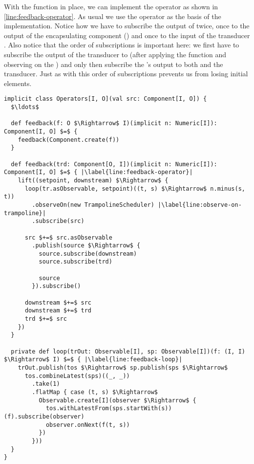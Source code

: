 With the  function in place, we can implement the  operator as shown in  \cref{line:feedback-operator}. As usual we use the  operator as the basis of the implementation. Notice how we have to subscribe the output of  twice, once to the output of the encapsulating component () and once to the input of the transducer . Also notice that the order of subscriptions is important here: we first have to subscribe the output of the transducer to  (after applying the  function and observing on the ) and only then subscribe the 's output to both  and the transducer. Just as with  this order of subscriptions prevents us from losing initial elements.

\begin{minipage}{\linewidth}
\begin{lstlisting}[style=ScalaStyle, caption={Feedback operator}, label={lst:feedback-operator}]
implicit class Operators[I, O](val src: Component[I, O]) {
  $\ldots$

  def feedback(f: O $\Rightarrow$ I)(implicit n: Numeric[I]): Component[I, O] $=$ {
    feedback(Component.create(f))
  }

  def feedback(trd: Component[O, I])(implicit n: Numeric[I]): Component[I, O] $=$ { |\label{line:feedback-operator}|
    lift((setpoint, downstream) $\Rightarrow$ {
      loop(tr.asObservable, setpoint)((t, s) $\Rightarrow$ n.minus(s, t))
        .observeOn(new TrampolineScheduler) |\label{line:observe-on-trampoline}|
        .subscribe(src)

      src $+=$ src.asObservable
        .publish(source $\Rightarrow$ {
          source.subscribe(downstream)
          source.subscribe(trd)

          source
        }).subscribe()

      downstream $+=$ src
      downstream $+=$ trd
      trd $+=$ src
    })
  }
  
  private def loop(trOut: Observable[I], sp: Observable[I])(f: (I, I) $\Rightarrow$ I) $=$ { |\label{line:feedback-loop}|
    trOut.publish(tos $\Rightarrow$ sp.publish(sps $\Rightarrow$
      tos.combineLatest(sps)((_, _))
        .take(1)
        .flatMap { case (t, s) $\Rightarrow$
          Observable.create[I](observer $\Rightarrow$ {
            tos.withLatestFrom(sps.startWith(s))(f).subscribe(observer)
            observer.onNext(f(t, s))
          })
        }))
  }
}
\end{lstlisting}
\end{minipage}
